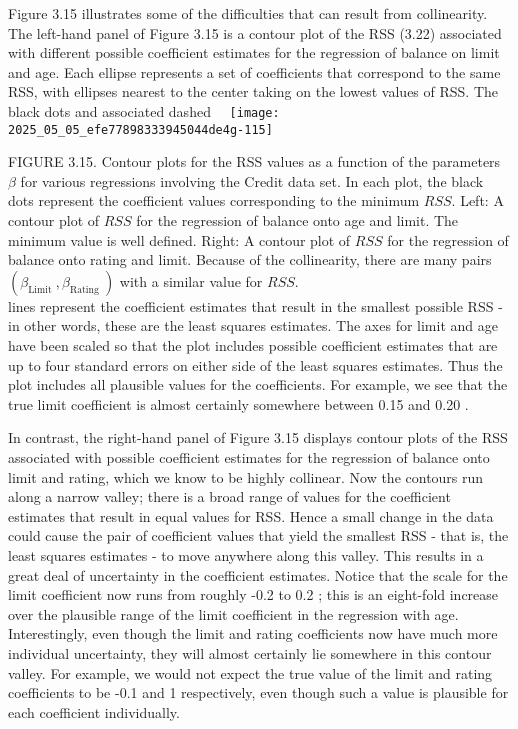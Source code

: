 \documentclass[10pt]{article}
\begin{document}
Figure 3.15 illustrates some of the difficulties that can result from collinearity. The left-hand panel of Figure 3.15 is a contour plot of the RSS (3.22) associated with different possible coefficient estimates for the regression of balance on limit and age. Each ellipse represents a set of coefficients that correspond to the same RSS, with ellipses nearest to the center taking on the lowest values of RSS. The black dots and associated dashed\
\
\texttt{[image: 2025\_05\_05\_efe77898333945044de4g-115]}

FIGURE 3.15. Contour plots for the RSS values as a function of the parameters $\beta$ for various regressions involving the Credit data set. In each plot, the black dots represent the coefficient values corresponding to the minimum $R S S$. Left: A contour plot of $R S S$ for the regression of balance onto age and limit. The minimum value is well defined. Right: A contour plot of $R S S$ for the regression of balance onto rating and limit. Because of the collinearity, there are many pairs $\left(\beta_{\text {Limit }}, \beta_{\text {Rating }}\right)$ with a similar value for $R S S$.\\
lines represent the coefficient estimates that result in the smallest possible RSS - in other words, these are the least squares estimates. The axes for limit and age have been scaled so that the plot includes possible coefficient estimates that are up to four standard errors on either side of the least squares estimates. Thus the plot includes all plausible values for the coefficients. For example, we see that the true limit coefficient is almost certainly somewhere between 0.15 and 0.20 .

In contrast, the right-hand panel of Figure 3.15 displays contour plots of the RSS associated with possible coefficient estimates for the regression of balance onto limit and rating, which we know to be highly collinear. Now the contours run along a narrow valley; there is a broad range of values for the coefficient estimates that result in equal values for RSS. Hence a small change in the data could cause the pair of coefficient values that yield the smallest RSS - that is, the least squares estimates - to move anywhere along this valley. This results in a great deal of uncertainty in the coefficient estimates. Notice that the scale for the limit coefficient now runs from roughly -0.2 to 0.2 ; this is an eight-fold increase over the plausible range of the limit coefficient in the regression with age. Interestingly, even though the limit and rating coefficients now have much more individual uncertainty, they will almost certainly lie somewhere in this contour valley. For example, we would not expect the true value of the limit and rating coefficients to be -0.1 and 1 respectively, even though such a value is plausible for each coefficient individually.
\end{document}
